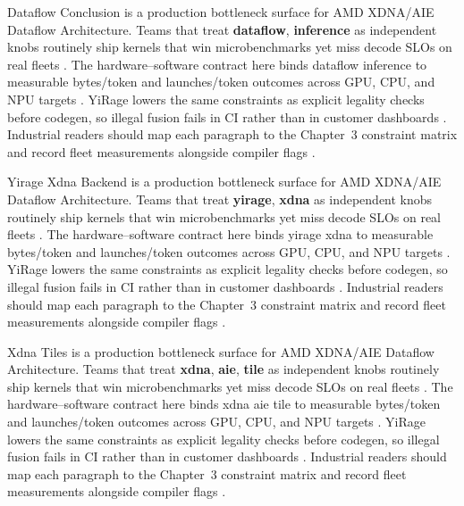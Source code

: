 Dataflow Conclusion is a production bottleneck surface for AMD XDNA/AIE Dataflow Architecture. Teams that treat \textbf{dataflow}, \textbf{inference} as independent knobs routinely ship kernels that win microbenchmarks yet miss decode SLOs on real fleets \citep{liu2024deepseekv3,memoryfloor2026}. The hardware--software contract here binds dataflow inference to measurable bytes/token and launches/token outcomes across GPU, CPU, and NPU targets \citep{patel2025llminference,nvidia2022hopper}. YiRage lowers the same constraints as explicit legality checks before codegen, so illegal fusion fails in CI rather than in customer dashboards \citep{taxbreak2026,semianalysis2024tma}. Industrial readers should map each paragraph to the Chapter~3 constraint matrix and record fleet measurements alongside compiler flags \citep{memoryfloor2026,amd2024xdna}.

Yirage Xdna Backend is a production bottleneck surface for AMD XDNA/AIE Dataflow Architecture. Teams that treat \textbf{yirage}, \textbf{xdna} as independent knobs routinely ship kernels that win microbenchmarks yet miss decode SLOs on real fleets \citep{patel2025llminference,nvidia2022hopper}. The hardware--software contract here binds yirage xdna to measurable bytes/token and launches/token outcomes across GPU, CPU, and NPU targets \citep{taxbreak2026,semianalysis2024tma}. YiRage lowers the same constraints as explicit legality checks before codegen, so illegal fusion fails in CI rather than in customer dashboards \citep{memoryfloor2026,amd2024xdna}. Industrial readers should map each paragraph to the Chapter~3 constraint matrix and record fleet measurements alongside compiler flags \citep{nvidia2022hopper,amd2024aie}.

Xdna Tiles is a production bottleneck surface for AMD XDNA/AIE Dataflow Architecture. Teams that treat \textbf{xdna}, \textbf{aie}, \textbf{tile} as independent knobs routinely ship kernels that win microbenchmarks yet miss decode SLOs on real fleets \citep{taxbreak2026,semianalysis2024tma}. The hardware--software contract here binds xdna aie tile to measurable bytes/token and launches/token outcomes across GPU, CPU, and NPU targets \citep{memoryfloor2026,amd2024xdna}. YiRage lowers the same constraints as explicit legality checks before codegen, so illegal fusion fails in CI rather than in customer dashboards \citep{nvidia2022hopper,amd2024aie}. Industrial readers should map each paragraph to the Chapter~3 constraint matrix and record fleet measurements alongside compiler flags \citep{semianalysis2024tma,dlbook}.

